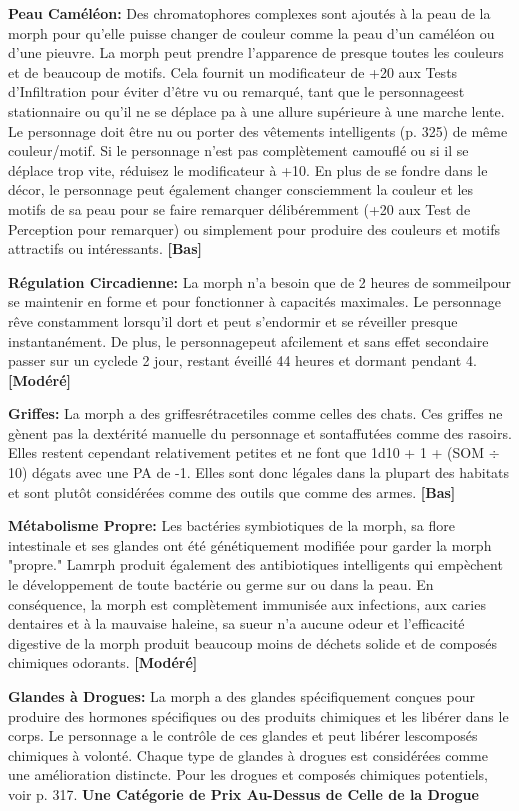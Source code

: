 \textbf{Peau Caméléon:} Des chromatophores complexes sont ajoutés à la peau de la morph pour qu'elle puisse changer de couleur comme la peau d'un caméléon ou d'une pieuvre. La morph peut prendre l'apparence de presque toutes les couleurs et de beaucoup de motifs. Cela fournit un modificateur de +20 aux Tests d'Infiltration pour éviter d'être vu ou remarqué, tant que le personnageest stationnaire ou qu'il ne se déplace pa à une allure supérieure à une marche lente. Le personnage doit être nu ou porter des vêtements intelligents (p. 325) de même couleur/motif. Si le personnage n'est pas complètement camouflé ou si il se déplace trop vite, réduisez le modificateur à +10. En plus de se fondre dans le décor, le personnage peut également changer consciemment la couleur et les motifs de sa peau pour se faire remarquer délibéremment (+20 aux Test de Perception pour remarquer) ou simplement pour produire des couleurs et motifs attractifs ou intéressants. \textbf{[Bas]} 

\textbf{Régulation Circadienne:} La morph n'a besoin que de 2 heures de sommeilpour se maintenir en forme et pour fonctionner à capacités maximales. 
Le personnage rêve constamment lorsqu'il dort et peut s'endormir et se réveiller presque instantanément. De plus, le personnagepeut afcilement et sans effet secondaire passer sur un cyclede 2 jour, restant éveillé 44 heures et dormant pendant 4. \textbf{[Modéré]} 

\textbf{Griffes:} La morph a des griffesrétracetiles comme celles des chats. Ces griffes ne gènent pas la dextérité manuelle du personnage et sontaffutées comme des rasoirs. Elles restent cependant relativement petites et ne font que 1d10 + 1 + (SOM $\div$ 10) dégats avec une PA de -1. Elles sont donc légales dans la plupart des habitats et sont plutôt considérées comme des outils que comme des armes. \textbf{[Bas]} 

\textbf{Métabolisme Propre:} Les bactéries symbiotiques de la morph, sa flore intestinale et ses glandes ont été génétiquement modifiée pour garder la morph "propre." Lamrph produit également des antibiotiques intelligents qui empèchent le développement de toute bactérie ou germe sur ou dans la peau. En conséquence, la morph est complètement immunisée aux infections, aux caries dentaires et à la mauvaise haleine, sa sueur n'a aucune odeur et l'efficacité digestive de la morph produit beaucoup moins de déchets solide et de composés chimiques odorants. \textbf{[Modéré]} 

\textbf{Glandes à Drogues:} La morph a des glandes spécifiquement conçues pour produire des hormones spécifiques ou des produits chimiques et les libérer dans le corps. Le personnage a le contrôle de ces glandes et peut libérer lescomposés chimiques à volonté. Chaque type de glandes à drogues est considérées comme une amélioration distincte. Pour les drogues et composés chimiques potentiels, voir p. 317. \textbf{{Une Catégorie de Prix Au-Dessus de Celle de la Drogue}} 

